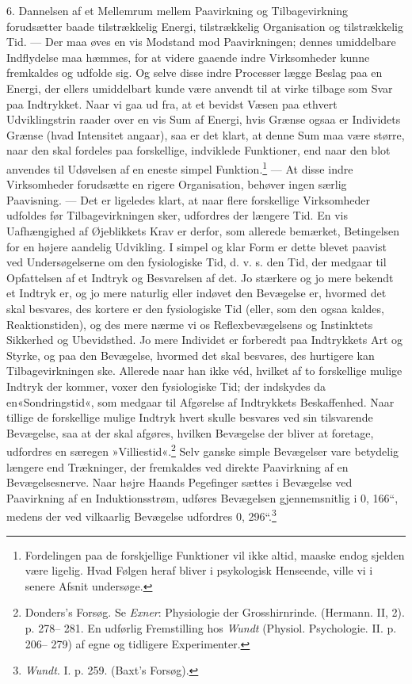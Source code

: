 \documentclass[12pt,a4paper,openany]{book}
\newcommand{\opage}[1]{\marginnote{\footnotesize\textit{[#1]}}}
\begin{document}
6. Dannelsen af et Mellemrum mellem Paavirkning og Tilbagevirkning
forudsætter baade tilstrækkelig Energi, tilstrækkelig Organisation og
tilstrækkelig Tid. --- Der maa øves en vis Modstand mod Paavirkningen;
dennes umiddelbare Indflydelse maa hæmmes, for at videre gaaende indre
Virksomheder kunne fremkaldes og udfolde sig. Og selve disse indre
\opage{111}Processer lægge Beslag paa en Energi, der ellers umiddelbart
kunde være anvendt til at virke tilbage som Svar paa Indtrykket. Naar vi
gaa ud fra, at et bevidst Væsen paa ethvert Udviklingstrin raader over
en vis Sum af Energi, hvis Grænse ogsaa er Individets Grænse (hvad
Intensitet angaar), saa er det klart, at denne Sum maa være større, naar
den skal fordeles paa forskellige, indviklede Funktioner, end naar den
blot anvendes til Udøvelsen af en eneste simpel
Funktion.\footnote[1]{Fordelingen paa de forskjellige Funktioner vil
ikke altid, maaske endog sjelden være ligelig. Hvad Følgen heraf bliver
i psykologisk Henseende, ville vi i senere Afsnit undersøge.} --- At
disse indre Virksomheder forudsætte en rigere Organisation, behøver
ingen særlig Paavisning. --- Det er ligeledes klart, at naar flere
forskellige Virksomheder udfoldes før Tilbagevirkningen sker, udfordres
der længere Tid. En vis Uafhængighed af Øjeblikkets Krav er derfor, som
allerede bemærket, Betingelsen for en højere aandelig Udvikling. I
simpel og klar Form er dette blevet paavist ved Undersøgelserne om den
fysiologiske Tid, d. v. s. den Tid, der medgaar til Opfattelsen af et
Indtryk og Besvarelsen af det. Jo stærkere og jo mere bekendt et Indtryk
er, og jo mere naturlig eller indøvet den Bevægelse er, hvormed det skal
besvares, des kortere er den fysiologiske Tid (eller, som den ogsaa
kaldes, Reaktionstiden), og des mere nærme vi os Reflexbevægelsens og
Instinktets Sikkerhed og Ubevidsthed. Jo mere Individet er forberedt paa
Indtrykkets Art og Styrke, og paa den Bevægelse, hvormed det skal
besvares, des hurtigere kan Tilbagevirkningen ske. Allerede naar han
ikke véd, hvilket af to forskellige mulige Indtryk der kommer, voxer den
fysiologiske Tid; der indskydes da en«Sondringstid«, som medgaar til
Afgørelse af Indtrykkets Beskaffenhed. Naar tillige de forskellige
mulige Indtryk hvert skulle besvares ved sin tilsvarende Bevægelse, saa
at der skal afgøres, hvilken Bevægelse der bliver at foretage, udfordres
en særegen »Villiestid«.\footnote[2]{Donders’s Forsøg. Se \emph{Exner}:
Physiologie der Grosshirnrinde. (Hermann. II, 2). p. 278-- 281. En
udførlig Fremstilling hos \emph{Wundt} (Physiol. Psychologie. II. p.
206-- 279) af egne og tidligere Experimenter.} Selv ganske simple
Bevægelser vare betydelig længere end Trækninger, der
\opage{112}fremkaldes ved direkte Paavirkning af en Bevægelsesnerve.
Naar højre Haands Pegefinger sættes i Bevægelse ved Paavirkning af en
Induktionsstrøm, udføres Bevægelsen gjennemsnitlig i 0, 166“, medens der
ved vilkaarlig Bevægelse udfordres 0, 296“.\footnote[1]{\emph{Wundt}. I.
p. 259. (Baxt’s Forsøg).}
\end{document}
